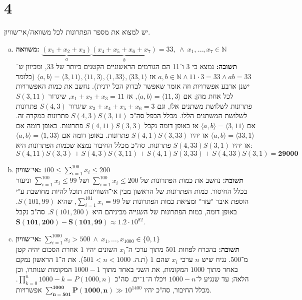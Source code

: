 \documentclass[]{article}
\newcommand\N     {\mathbb{N}}
\newcommand\ra    {\rangle}
\newcommand\la    {\langle}
\begin{document}
	\section*{4} %
	יש למצוא את מספר הפתרונות לכל משוואה/אי־שוויון.
	\begin{enumerate}[(a)]
		\item \textbf{משוואה:}
		$\underbrace{(x_1 + x_2 + x_3)}_a\underbrace{(x_4 + x_5 + x_6 + x_7)}_{b} = 33, \ \land \ x_1, \dots, x_7 \in \N$ \\
		\textbf{תשובה: }נמצא כי 3 ו־11 הם הגורמים הראשוניים הקטנים ביותר של $33$, ומכיוון ש־$a, b \in \N \land 11 \cdot 3 = 33 \land ab = 33$ אז $\la a, b \ra = \la 3, 11 \ra, \la 11, 3 \ra, \la 1, 33 \ra, \la 33, 1 \ra$ (כלומר ישנן ארבע אפשרויות וזה אומר שאפשר לבדוק הכל ידנית). נחשב את כמות האפשרויות לכל אחת מהן; אם $\la a, b \ra = \la 11, 3 \ra$, אז $x_1 + x_2 + x_3 = 11$, שיגרור $S(3, 11)$ פתרונות לשלושת משתנים אלו, וגם $ x_3 + x_4 + x_5 + x_6 = 3$ שיגרור $S(4, 3)$ פתרונות לשלושת המשתנים הללו. מכלל הכפל סה"כ $S(4, 3)S(3, 11)$ פתרונות במקרה זה. אם $\la a, b \ra = \la 3, 11 \ra$ אז באופן דומה נקבל $S(4, 11)S(3, 3)$ פתרונות. באופן דומה אם $\la a, b \ra = \la 33, 1 \ra$ אז יהיו $S(4, 1)S(3, 33)$ פתרונות. באופן דומה אם $\la a, b \ra = \la 1, 33 \ra$ אז יהיו $S(4, 33)S(3, 1)$ פתרונות.
		סה"כ מכלל החיבור נמצא שכמות הפתרונות היא: 
		\[ S(4, 11)S(3, 3) + S(4, 3)S(3, 11) + S(4, 1)S(3, 33) + S(4, 33)S(3, 1) = \bm{29000} \]
		\item \textbf{אי־שוויון: }$100 \le \sum_{i = 1}^{100}x_i \le 200$ \\
		\textbf{תשובה: }נחשב את כמות הפתרונות של $\sum_{i = 1}^{100}x_i \le 200$ ושל $\sum_{i = 1}^{100}x_i \le 99$ וניעזר בכלל החיסור. כמות הפתרונות של הראשון מבין אי־השוויונות תוכל להיות מחושבת ע"י הוספת איבר "עזר" ומציאת כמות הפתרונות של $\sum_{i = 1}^{101}x_i = 99$, שהיא $S(101, 99)$. באופן דומה, כמות הפתרונות של השנייה מביניהם היא $S(101, 200)$. סה"כ נקבל $\bm{S(101, 200) - S(101, 99)} \approx 1.2 \cdot 10^{82}$. 
		
		\item \textbf{אי־שוויון: }$\sum_{i = 1}^{1000}x_i > 500 \ \land \ x_1, \dots, x_{1000} \in \{0, 1\}$ \\
		\textbf{תשובה: }בהכרח לפחות 501 מתוך ערכי ה־$x_i$ השונים יהיו $1$ אחרת הסכום יהיה קטן מ־500. נניח שיש $n$ ערכי $x_i$ שהם $1$ (ת.ה. $ 501 < n < 1000 $). את ה־$1$ הראשון נמקם באחד מתוך $1000$ המקומות, את השני באחד מתוך $1000 - 1$ המקומות שנותרו, וכן הלאה; עד שנגיע ל־$1000 - n$ ויכלו ה־$1$־ים. סה"כ $\prod_{k = 0}^{n}1000 - k = P(1000, n)$. מכלל החיבור, סה"כ יהיו $\bm{\sum_{n = 501}^{1000}P(1000, n)} \gg 10^{1400}$ אפשרויות. 
	\end{enumerate}
\end{document}
